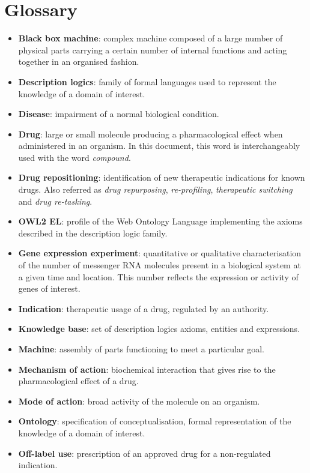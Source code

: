 \appendix
\chapter{Glossary}
\begin{itemize}
  \item \textbf{Black box machine}: complex machine composed of a large number of physical parts carrying a certain number of internal functions and acting together in an organised fashion.
  \item \textbf{Description logics}: family of formal languages used to represent the knowledge of a domain of interest.
  \item \textbf{Disease}: impairment of a normal biological condition.
  \item \textbf{Drug}: large or small molecule producing a pharmacological effect when administered in an organism. In this document, this word is interchangeably used with the word \emph{compound}.
  \item \textbf{Drug repositioning}: identification of new therapeutic indications for known drugs. Also referred as \emph{drug repurposing}, \emph{re-profiling}, \emph{therapeutic switching} and \emph{drug re-tasking}.
  \item \textbf{OWL2 EL}: profile of the Web Ontology Language implementing the axioms described in the description logic  family. 
  \item \textbf{Gene expression experiment}: quantitative or qualitative characterisation of the number of messenger RNA molecules present in a biological system at a given time and location. This number reflects the expression or activity of genes of interest.
  \item \textbf{Indication}: therapeutic usage of a drug, regulated by an authority.
  \item \textbf{Knowledge base}: set of description logics axioms, entities and expressions.
  \item \textbf{Machine}: assembly of parts functioning to meet a particular goal.
  \item \textbf{Mechanism of action}: biochemical interaction that gives rise to the pharmacological effect of a drug.
  \item \textbf{Mode of action}: broad activity of the molecule on an organism.
  \item \textbf{Ontology}: specification of conceptualisation, formal representation of the knowledge of a domain of interest.
  \item \textbf{Off-label use}: prescription of an approved drug for a non-regulated indication.

\end{itemize}
